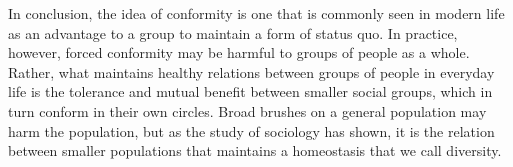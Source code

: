 \documentclass[12pt,letterpaper]{report}
\begin{document}
  \par In conclusion, the idea of conformity is one that is commonly seen in modern life as an advantage to a group to maintain a form of status quo. In practice, however, forced conformity may be harmful to groups of people as a whole. Rather, what maintains healthy relations between groups of people in everyday life is the tolerance and mutual benefit between smaller social groups, which in turn conform in their own circles. Broad brushes on a general population may harm the population, but as the study of sociology has shown, it is the relation between smaller populations that maintains a homeostasis that we call diversity.
  
  
\end{document}
